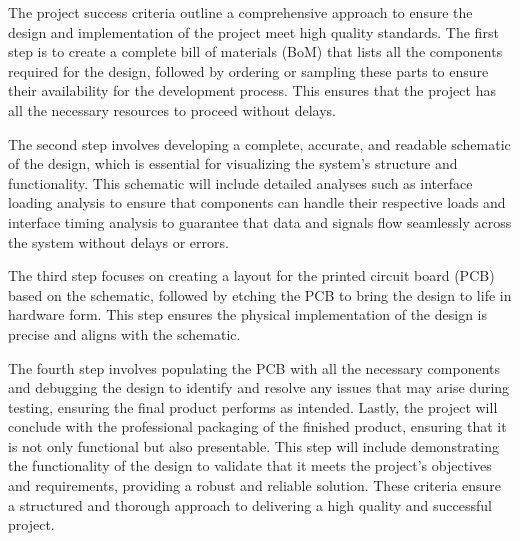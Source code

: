 \documentclass[12pt]{article}
\begin{document}
\par The project success criteria outline a comprehensive approach to ensure the design and implementation of the project meet high quality standards. The first step is to create a complete bill of materials (BoM) that lists all the components required for the design, followed by ordering or sampling these parts to ensure their availability for the development process. This ensures that the project has all the necessary resources to proceed without delays. 

\par The second step involves developing a complete, accurate, and readable schematic of the design, which is essential for visualizing the system’s structure and functionality. This schematic will include detailed analyses such as interface loading analysis to ensure that components can handle their respective loads and interface timing analysis to guarantee that data and signals flow seamlessly across the system without delays or errors.

\par The third step focuses on creating a layout for the printed circuit board (PCB) based on the schematic, followed by etching the PCB to bring the design to life in hardware form. This step ensures the physical implementation of the design is precise and aligns with the schematic. 

\par The fourth step involves populating the PCB with all the necessary components and debugging the design to identify and resolve any issues that may arise during testing, ensuring the final product performs as intended. Lastly, the project will conclude with the professional packaging of the finished product, ensuring that it is not only functional but also presentable. This step will include demonstrating the functionality of the design to validate that it meets the project's objectives and requirements, providing a robust and reliable solution. These criteria ensure a structured and thorough approach to delivering a high quality and successful project.
\end{document}
